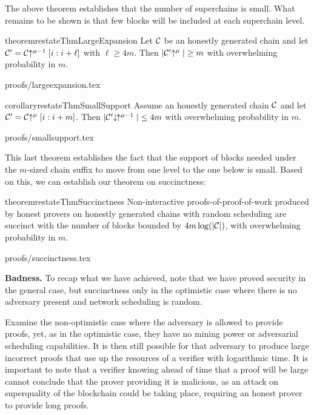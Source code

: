 The above theorem establishes that the number of superchains is small. What
remains to be shown is that few blocks will be included at each superchain
level.

\begin{restatable}{theorem}{restateThmLargeExpansion}
    \label{thm.large-expansion}
    Let $\mathcal{C}$ be an honestly generated chain and let
    $\mathcal{C}' = \mathcal{C}\negthickspace\uparrow^{\mu - 1}[i:i + \ell]$ with $\ell \geq 4m$.
    Then $|\mathcal{C}'\negthickspace\uparrow^\mu| \geq m$
    with overwhelming probability in $m$.
\end{restatable}

\ifonecolumn
{proofs/largeexpansion.tex}
\fi

\begin{restatable}{corollary}{restateThmSmallSupport}
    \label{crly.small-support}
    Assume an honestly generated chain $\mathcal{C}$ and let $\mathcal{C}' = \mathcal{C}\negthickspace\uparrow^\mu[i:i + m]$. Then
    $|\mathcal{C}'\negthickspace\downarrow\,\negthickspace\uparrow^{\mu - 1}| \leq 4m$
    with overwhelming probability in $m$.
\end{restatable}

\ifonecolumn
{proofs/smallsupport.tex}
\fi

This last theorem establishes the fact that the support of blocks needed under
the $m$-sized chain suffix to move from one level to the one below is small.
Based on this, we can establish our theorem on succinctness:

\begin{restatable}{theorem}{restateThmSuccinctness}
    \label{thm.succinctness}
    Non-interactive proofs-of-proof-of-work produced by honest provers on
    honestly generated chains with random scheduling are succinct with the
    number of blocks bounded by $4m \log(|\mathcal{C}|)$, with overwhelming
    probability in $m$.
\end{restatable}

\ifonecolumn
{proofs/succinctness.tex}
\else
\fi

\textbf{Badness.}
To recap what we have achieved, note that we have proved security in the general
case, but succinctness only in the optimistic case where there is no adversary
present and network scheduling is random.

Examine the non-optimistic case where the adversary is allowed to provide
proofs, yet, as in the optimistic case, they have no mining power or adversarial
scheduling capabilities. It is then still possible for that adversary to produce
large incorrect proofs that use up the resources of a verifier with logarithmic
time. It is important to note that a verifier knowing ahead of time that a proof
will be large cannot conclude that the prover providing it is malicious, as an
attack on superquality of the blockchain could be taking place, requiring an
honest prover to provide long proofs.


